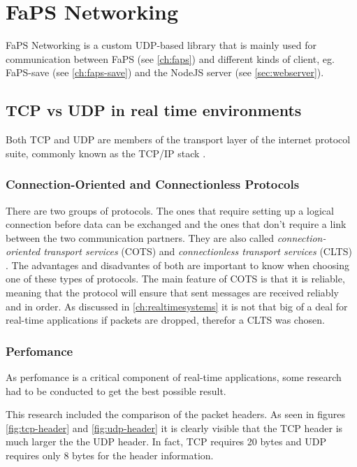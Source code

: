 \chapter{FaPS Networking}
\label{ch:faps-networking}

\author{Nico Kratky}
%
FaPS Networking is a custom UDP-based library that is mainly used for communication between FaPS (see \ref{ch:faps}) and different kinds of client, eg. FaPS-save (see \ref{ch:faps-save}) and the NodeJS server (see
\ref{sec:webserver}).

\section{TCP vs UDP in real time environments}

Both TCP and UDP are members of the transport layer of the internet protocol suite, commonly known as the TCP/IP stack \autocite{rfc1122}.

\subsection{Connection-Oriented and Connectionless Protocols}

There are two groups of protocols. The ones that require setting up a logical connection before data can be exchanged and the ones that don't require a link between the two communication partners. They are also called
\textit{connection-oriented transport services} (COTS) and \textit{connectionless transport services} (CLTS) \autocite{connectionbased-vs-connectionless}. The advantages and disadvantes of both are important to know when choosing one of these types of protocols.
The main feature of COTS is that it is reliable, meaning that the protocol will ensure that sent messages are received reliably and in order. As discussed in \ref{ch:realtimesystems} it is not that big of a deal for
real-time applications if packets are dropped, therefor a CLTS was chosen.

\subsection{Perfomance}

As perfomance is a critical component of real-time applications, some research had to be conducted to get the best possible result.

This research included the comparison of the packet headers. As seen in figures \ref{fig:tcp-header} and \ref{fig:udp-header} it is clearly visible that the TCP header is much larger the the UDP header. In fact, TCP requires 20 bytes and UDP requires only 8 bytes for the header information.

